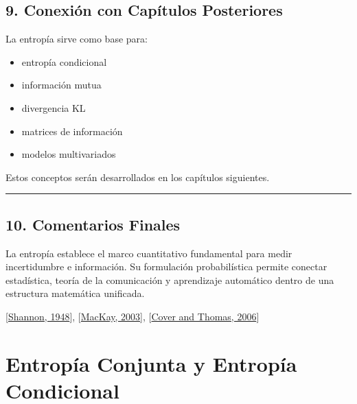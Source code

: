 \documentclass[letterpaper,10pt,english]{jupyterBook}
\begin{document}
\section{9. Conexión con Capítulos Posteriores}
\label{\detokenize{01_theory/entropy:conexion-con-capitulos-posteriores}}
\sphinxAtStartPar
La entropía sirve como base para:
\begin{itemize}
\item {} 
\sphinxAtStartPar
entropía condicional

\item {} 
\sphinxAtStartPar
información mutua

\item {} 
\sphinxAtStartPar
divergencia KL

\item {} 
\sphinxAtStartPar
matrices de información

\item {} 
\sphinxAtStartPar
modelos multivariados

\end{itemize}

\sphinxAtStartPar
Estos conceptos serán desarrollados en los capítulos siguientes.


\bigskip\hrule\bigskip



\section{10. Comentarios Finales}
\label{\detokenize{01_theory/entropy:comentarios-finales}}
\sphinxAtStartPar
La entropía establece el marco cuantitativo fundamental para medir incertidumbre e información. Su formulación probabilística permite conectar estadística, teoría de la comunicación y aprendizaje automático dentro de una estructura matemática unificada.

\sphinxAtStartPar
{[}\hyperlink{cite.05_appendices/references:id6}{Shannon, 1948}{]}, {[}\hyperlink{cite.05_appendices/references:id3}{MacKay, 2003}{]}, {[}\hyperlink{cite.05_appendices/references:id2}{Cover and Thomas, 2006}{]}

\sphinxstepscope


\chapter{Entropía Conjunta y Entropía Condicional}
\label{\detokenize{01_theory/conditional_entropy:entropia-conjunta-y-entropia-condicional}}\label{\detokenize{01_theory/conditional_entropy::doc}}
\end{document}
